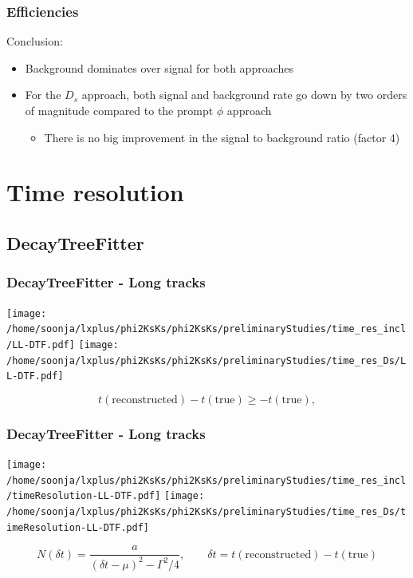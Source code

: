 \documentclass{beamer}
\begin{document}
\begin{frame}
\frametitle{Efficiencies}
Conclusion:
\begin{itemize}
\item Background dominates over signal for both approaches
\item For the $D_s$ approach, both signal and background rate go down by two orders of magnitude compared to the prompt $\phi$ approach
\begin{itemize}
\item There is no big improvement in the signal to background ratio (factor 4)
\end{itemize}
\end{itemize}

\end{frame}

\section{Time resolution}
\subsection{DecayTreeFitter}
\begin{frame}
\frametitle{DecayTreeFitter - Long tracks}

\begin{center}
\texttt{[image: /home/soonja/lxplus/phi2KsKs/phi2KsKs/preliminaryStudies/time\_res\_incl/LL-DTF.pdf]}
\texttt{[image: /home/soonja/lxplus/phi2KsKs/phi2KsKs/preliminaryStudies/time\_res\_Ds/LL-DTF.pdf]}
\end{center}

\begin{equation*}
t(\text{reconstructed})-t(\text{true})\geq - t(\text{true}),
\end{equation*}
\end{frame}

\begin{frame}
\frametitle{DecayTreeFitter - Long tracks}

\begin{center}
\texttt{[image: /home/soonja/lxplus/phi2KsKs/phi2KsKs/preliminaryStudies/time\_res\_incl/timeResolution-LL-DTF.pdf]}
\texttt{[image: /home/soonja/lxplus/phi2KsKs/phi2KsKs/preliminaryStudies/time\_res\_Ds/timeResolution-LL-DTF.pdf]}
\end{center}

\begin{equation*}
N(\delta t) = \frac{a}{(\delta t- \mu)^2 - \Gamma^2/4}, \qquad \delta t = t(\text{reconstructed})-t(\text{true}) 
\end{equation*}
\end{frame}
\end{document}
